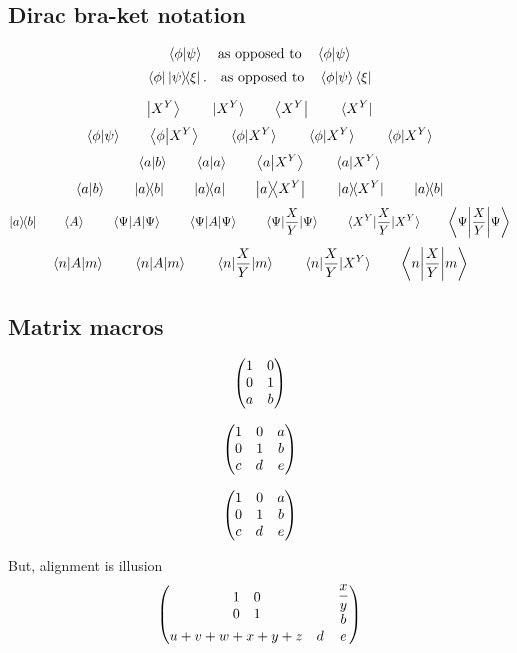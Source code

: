 \documentclass{article}
\newcommand{\tall}{X^Y}
\newcommand{\grande}{\frac{X}{Y}}
\begin{document}
\subsection{Dirac bra-ket notation}
\begin{displaymath}
  \bra{\phi}\ket{\psi}  \qq{as opposed to} \bra{\phi} \ket{\psi}
\end{displaymath}
\begin{displaymath}
 \bra{\phi}\dyad{\psi}{\xi}.
 \qq{as opposed to}
 \bra{\phi}\ket{\psi}\bra{\xi}
\end{displaymath}

\[
 \ket{\tall}
\qquad \ket*{\tall}
\qquad \bra{\tall}
\qquad \bra*{\tall}
\]
\[
 \bra{\phi}\ket{\psi}
\qquad \bra{\phi}\ket{\tall}
\qquad \bra{\phi}\ket*{\tall}
\qquad \bra*{\phi}\ket{\tall}
\qquad \bra*{\phi}\ket*{\tall}
\]
\[
 \braket{a}{b}
\qquad \braket{a}
\qquad \braket{a}{\tall}
\qquad \braket*{a}{\tall}
\]
\[
 \ip{a}{b}
\qquad \dyad{a}{b}
\qquad \dyad{a}
\qquad \dyad{a}{\tall}
\qquad \dyad*{a}{\tall}
\qquad \ketbra{a}{b}
\]
\[
 \op{a}{b}
\qquad \expval{A}
\qquad \expval{A}{\Psi}
\qquad \ev{A}{\Psi}
\qquad \ev{\grande}{\Psi}
\qquad \ev*{\grande}{\tall}
\qquad \ev**{\grande}{\Psi}
\]
\[
 \matrixel{n}{A}{m}
\qquad \mel{n}{A}{m}
\qquad \mel{n}{\grande}{m}
\qquad \mel*{n}{\grande}{\tall}
\qquad \mel**{n}{\grande}{m}
\]

\subsection{Matrix macros}
\[\begin{pmatrix}
\imat{2} \\ a & b
\end{pmatrix}
\]

\[
\begin{pmatrix}
\mqty{\imat{2}} & \mqty{a\\b} \\ \mqty{c & d} & e
\end{pmatrix}
\]

\[
\mqty(\mqty{\imat{2}} & \mqty{a\\b} \\ \mqty{c & d} & e)
\]

But, alignment is illusion
\[
  \begin{pmatrix}
    \mqty{\imat{2}} & \mqty{\displaystyle\frac{x}{y}\\b} \\ \mqty{u+v+w+x+y+z & d} & e
  \end{pmatrix}
\]
\end{document}
